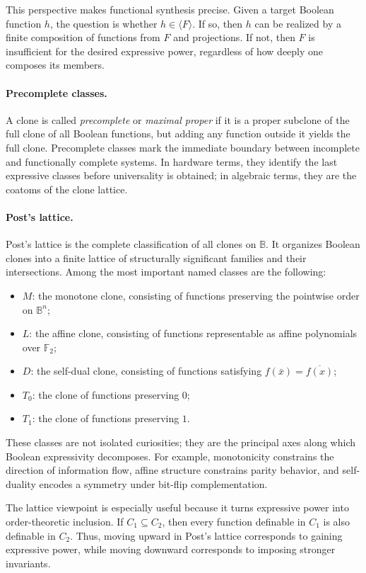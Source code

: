 \documentclass[11pt]{article}
\begin{document}
This perspective makes functional synthesis precise. Given a target Boolean function $h$, the question is whether $h \in \langle F\rangle$. If so, then $h$ can be realized by a finite composition of functions from $F$ and projections. If not, then $F$ is insufficient for the desired expressive power, regardless of how deeply one composes its members.

\paragraph{Precomplete classes.}
A clone is called \emph{precomplete} or \emph{maximal proper} if it is a proper subclone of the full clone of all Boolean functions, but adding any function outside it yields the full clone. Precomplete classes mark the immediate boundary between incomplete and functionally complete systems. In hardware terms, they identify the last expressive classes before universality is obtained; in algebraic terms, they are the coatoms of the clone lattice.

\paragraph{Post's lattice.}
Post's lattice is the complete classification of all clones on $\mathbb{B}$. It organizes Boolean clones into a finite lattice of structurally significant families and their intersections. Among the most important named classes are the following:
\begin{itemize}
  \item $M$: the monotone clone, consisting of functions preserving the pointwise order on $\mathbb{B}^n$;
  \item $L$: the affine clone, consisting of functions representable as affine polynomials over $\mathbb{F}_2$;
  \item $D$: the self-dual clone, consisting of functions satisfying $f(\bar{x}) = \overline{f(x)}$;
  \item $T_0$: the clone of functions preserving $0$;
  \item $T_1$: the clone of functions preserving $1$.
\end{itemize}
These classes are not isolated curiosities; they are the principal axes along which Boolean expressivity decomposes. For example, monotonicity constrains the direction of information flow, affine structure constrains parity behavior, and self-duality encodes a symmetry under bit-flip complementation.

The lattice viewpoint is especially useful because it turns expressive power into order-theoretic inclusion. If $C_1 \subseteq C_2$, then every function definable in $C_1$ is also definable in $C_2$. Thus, moving upward in Post's lattice corresponds to gaining expressive power, while moving downward corresponds to imposing stronger invariants.
\end{document}
